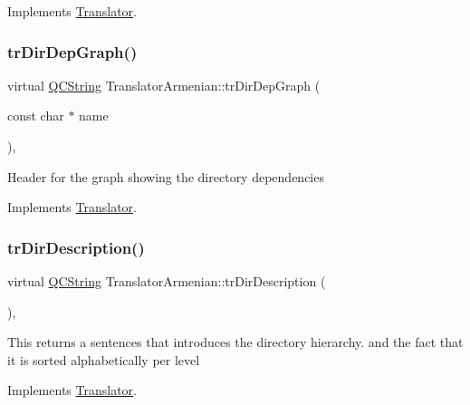 Implements \mbox{\hyperlink{class_translator}{Translator}}.

\mbox{\label{class_translator_armenian_a8ce2837746d4329f149e0d94a1b3cf76}} 
\subsubsection{\texorpdfstring{trDirDepGraph()}{trDirDepGraph()}}
{\footnotesize\ttfamily virtual \mbox{\hyperlink{class_q_c_string}{Q\+C\+String}} Translator\+Armenian\+::tr\+Dir\+Dep\+Graph (\begin{DoxyParamCaption}\item[{const char $\ast$}]{name }\end{DoxyParamCaption})\hspace{0.3cm}{\ttfamily [inline]}, {\ttfamily [virtual]}}

Header for the graph showing the directory dependencies 

Implements \mbox{\hyperlink{class_translator}{Translator}}.

\mbox{\label{class_translator_armenian_a89099938926ff2ec4f490230b8717235}} 
\subsubsection{\texorpdfstring{trDirDescription()}{trDirDescription()}}
{\footnotesize\ttfamily virtual \mbox{\hyperlink{class_q_c_string}{Q\+C\+String}} Translator\+Armenian\+::tr\+Dir\+Description (\begin{DoxyParamCaption}{ }\end{DoxyParamCaption})\hspace{0.3cm}{\ttfamily [inline]}, {\ttfamily [virtual]}}

This returns a sentences that introduces the directory hierarchy. and the fact that it is sorted alphabetically per level 

Implements \mbox{\hyperlink{class_translator}{Translator}}.

\mbox{\label{class_translator_armenian_aba99a4371975d1372c57eb65d60997b8}} 
